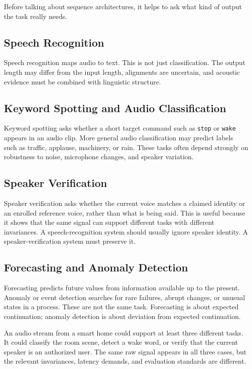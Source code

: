 Before talking about sequence architectures, it helps to ask what kind of output the task really needs.

\subsection{Speech Recognition}

Speech recognition maps audio to text. This is not just classification. The output length may differ from the input length, alignments are uncertain, and acoustic evidence must be combined with linguistic structure.

\subsection{Keyword Spotting and Audio Classification}

Keyword spotting asks whether a short target command such as \texttt{stop} or \texttt{wake} appears in an audio clip. More general audio classification may predict labels such as traffic, applause, machinery, or rain. These tasks often depend strongly on robustness to noise, microphone changes, and speaker variation.

\subsection{Speaker Verification}

Speaker verification asks whether the current voice matches a claimed identity or an enrolled reference voice, rather than what is being said. This is useful because it shows that the same signal can support different tasks with different invariances. A speech-recognition system should usually ignore speaker identity. A speaker-verification system must preserve it.

\subsection{Forecasting and Anomaly Detection}

Forecasting predicts future values from information available up to the present. Anomaly or event detection searches for rare failures, abrupt changes, or unusual states in a process. These are not the same task. Forecasting is about expected continuation; anomaly detection is about deviation from expected continuation.

\begin{example}
An audio stream from a smart home could support at least three different tasks. It could classify the room scene, detect a wake word, or verify that the current speaker is an authorized user. The same raw signal appears in all three cases, but the relevant invariances, latency demands, and evaluation standards are different.
\end{example}

